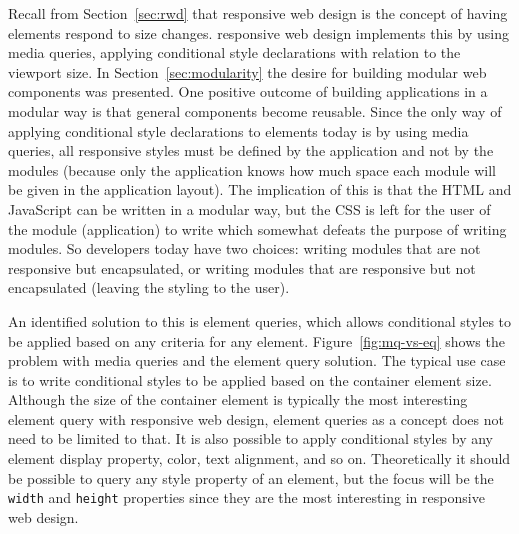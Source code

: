 \documentclass[a4paper,11pt]{kth-mag}
\newcommand{\code}[1]{\texttt{#1}}
\begin{document}
        Recall from Section~\ref{sec:rwd} that \gls{responsive} \gls{web} design is the concept of having \glspl{element} respond to size changes.
        \Gls{responsive} \gls{web} design implements this by using \gls{media queries}, applying conditional style declarations with relation to the \gls{viewport} size.
        In Section~\ref{sec:modularity} the desire for building modular \gls{web} components was presented.
        One positive outcome of building applications in a modular way is that general components become reusable.
        Since the only way of applying conditional style declarations to \glspl{element} today is by using \gls{media queries}, all \gls{responsive} styles must be defined by the application and not by the modules (because only the application knows how much space each module will be given in the application layout).
        The implication of this is that the \gls{HTML} and \gls{JavaScript} can be written in a modular way, but the \gls{CSS} is left for the user of the module (application) to write which somewhat defeats the purpose of writing modules.
        So developers today have two choices: writing modules that are not \gls{responsive} but \gls{encapsulated}, or writing modules that are \gls{responsive} but not \gls{encapsulated} (leaving the styling to the user).

        An identified solution to this is element queries, which allows conditional styles to be applied based on any criteria for any \gls{element}.
        Figure~\ref{fig:mq-vs-eq} shows the problem with \gls{media queries} and the element query solution.
        The typical use case is to write conditional styles to be applied based on the container \gls{element} size.
        Although the size of the container \gls{element} is typically the most interesting element query with \gls{responsive} \gls{web} design, element queries as a concept does not need to be limited to that.
        It is also possible to apply conditional styles by any \gls{element} display property, color, text alignment, and so on.
        Theoretically it should be possible to query any style property of an \gls{element}, but the focus will be the \code{width} and \code{height} properties since they are the most interesting in \gls{responsive} \gls{web} design.
\end{document}
